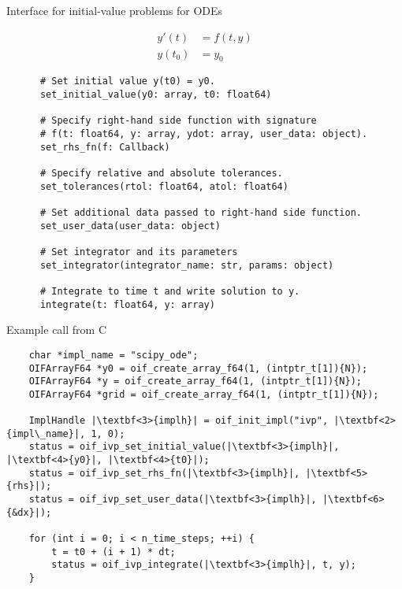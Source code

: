 \documentclass[10pt, aspectratio=169, progressbar=frametitle]{beamer}
\begin{document}
\begin{frame}[fragile]{Interface for initial-value problems for ODEs}
  \begin{minipage}{\dimexpr0.22\textwidth-2\tabcolsep}
    \begin{align*}
      y'(t)  & = f(t, y) \\
      y(t_0) & = y_0
    \end{align*}
  \end{minipage}
  \begin{minipage}{\dimexpr0.73\textwidth-2\tabcolsep}
    {\footnotesize
    \begin{verbatim}
      # Set initial value y(t0) = y0.
      set_initial_value(y0: array, t0: float64)

      # Specify right-hand side function with signature
      # f(t: float64, y: array, ydot: array, user_data: object).
      set_rhs_fn(f: Callback)

      # Specify relative and absolute tolerances.
      set_tolerances(rtol: float64, atol: float64)

      # Set additional data passed to right-hand side function.
      set_user_data(user_data: object)

      # Set integrator and its parameters
      set_integrator(integrator_name: str, params: object)

      # Integrate to time t and write solution to y.
      integrate(t: float64, y: array)
    \end{verbatim}
    }
  \end{minipage}
\end{frame}

\begin{frame}[fragile]{Example call from C}
  \begin{verbatim}
    char *impl_name = "scipy_ode";
    OIFArrayF64 *y0 = oif_create_array_f64(1, (intptr_t[1]){N});
    OIFArrayF64 *y = oif_create_array_f64(1, (intptr_t[1]){N});
    OIFArrayF64 *grid = oif_create_array_f64(1, (intptr_t[1]){N});

    ImplHandle |\textbf<3>{implh}| = oif_init_impl("ivp", |\textbf<2>{impl\_name}|, 1, 0);
    status = oif_ivp_set_initial_value(|\textbf<3>{implh}|, |\textbf<4>{y0}|, |\textbf<4>{t0}|);
    status = oif_ivp_set_rhs_fn(|\textbf<3>{implh}|, |\textbf<5>{rhs}|);
    status = oif_ivp_set_user_data(|\textbf<3>{implh}|, |\textbf<6>{&dx}|);

    for (int i = 0; i < n_time_steps; ++i) {
        t = t0 + (i + 1) * dt;
        status = oif_ivp_integrate(|\textbf<3>{implh}|, t, y);
    }
  \end{verbatim}
\end{frame}
\end{document}
